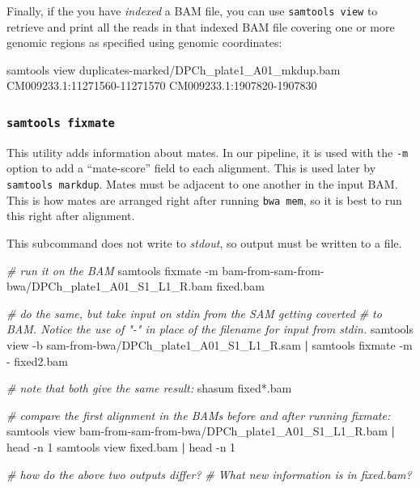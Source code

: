 \documentclass[]{krantz}
\makeatletter
\newenvironment{Shaded}{\begin{snugshade}}{\end{snugshade}}
\newcommand{\CommentTok}[1]{\textcolor[rgb]{0.37,0.37,0.37}{\textit{#1}}}
\newcommand{\ExtensionTok}[1]{#1}
\newcommand{\FunctionTok}[1]{\textcolor[rgb]{0,0,0}{#1}}
\newcommand{\KeywordTok}[1]{\textcolor[rgb]{0.27,0.27,0.27}{\textbf{#1}}}
\newcommand{\NormalTok}[1]{#1}
\newenvironment{kframe}{%
\medskip{}
\setlength{\fboxsep}{.8em}
 \def\at@end@of@kframe{}%
 \ifinner\ifhmode%
  \def\at@end@of@kframe{\end{minipage}}%
  \begin{minipage}{\columnwidth}%
 \fi\fi%
 \def\FrameCommand##1{\hskip\@totalleftmargin \hskip-\fboxsep
 \colorbox{shadecolor}{##1}\hskip-\fboxsep
     \hskip-\linewidth \hskip-\@totalleftmargin \hskip\columnwidth}%
 \MakeFramed {\advance\hsize-\width
   \@totalleftmargin\z@ \linewidth\hsize
   \@setminipage}}%
 {\par\unskip\endMakeFramed%
 \at@end@of@kframe}
\renewenvironment{Shaded}{\begin{kframe}}{\end{kframe}}
\makeatother
\begin{document}
Finally, if the you have \emph{indexed} a BAM file, you can use \texttt{samtools\ view}
to retrieve and print all the reads in that indexed BAM file covering one
or more genomic regions as specified using genomic coordinates:

\begin{Shaded}
\begin{Highlighting}[]
\ExtensionTok{samtools}\NormalTok{ view duplicates-marked/DPCh_plate1_A01_mkdup.bam  CM009233.1:11271560-11271570  CM009233.1:1907820-1907830}
\end{Highlighting}
\end{Shaded}

\hypertarget{samtools-fixmate}{%
\subsubsection{\texorpdfstring{\texttt{samtools\ fixmate}}{samtools fixmate}}\label{samtools-fixmate}}

This utility adds information about mates. In our pipeline, it is used
with the \texttt{-m} option to add
a ``mate-score'' field to each alignment. This is used later by \texttt{samtools\ markdup}.
Mates must be adjacent to one another in the input BAM. This is how mates are arranged
right after running \texttt{bwa\ mem}, so it is best to run this right after alignment.

This subcommand does not write to \emph{stdout}, so output must be written to a file.

\begin{Shaded}
\begin{Highlighting}[]
\CommentTok{# run it on the BAM}
\ExtensionTok{samtools}\NormalTok{ fixmate -m bam-from-sam-from-bwa/DPCh_plate1_A01_S1_L1_R.bam  fixed.bam}

\CommentTok{# do the same, but take input on stdin from the SAM getting coverted}
\CommentTok{# to BAM. Notice the use of "-" in place of the filename for input from stdin.}
\ExtensionTok{samtools}\NormalTok{ view -b sam-from-bwa/DPCh_plate1_A01_S1_L1_R.sam }\KeywordTok{|} \ExtensionTok{samtools}\NormalTok{ fixmate -m - fixed2.bam}

\CommentTok{# note that both give the same result:}
\ExtensionTok{shasum}\NormalTok{ fixed*.bam}

\CommentTok{# compare the first alignment in the BAMs before and after running fixmate:}
\ExtensionTok{samtools}\NormalTok{ view bam-from-sam-from-bwa/DPCh_plate1_A01_S1_L1_R.bam }\KeywordTok{|} \FunctionTok{head}\NormalTok{ -n 1}
\ExtensionTok{samtools}\NormalTok{ view fixed.bam }\KeywordTok{|} \FunctionTok{head}\NormalTok{ -n 1}

\CommentTok{# how do the above two outputs differ?}
\CommentTok{# What new information is in fixed.bam?}
\end{Highlighting}
\end{Shaded}
\end{document}
